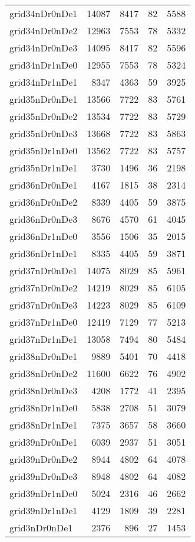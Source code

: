 \documentclass[../../../thesis.tex]{subfiles}
\begin{document}
\begin{longtable}{lrrrr}
grid34nDr0nDe1 & 14087 & 8417 & 82 & 5588 \\
grid34nDr0nDe2 & 12963 & 7553 & 78 & 5332 \\
grid34nDr0nDe3 & 14095 & 8417 & 82 & 5596 \\
grid34nDr1nDe0 & 12955 & 7553 & 78 & 5324 \\
grid34nDr1nDe1 & 8347 & 4363 & 59 & 3925 \\
grid35nDr0nDe1 & 13566 & 7722 & 83 & 5761 \\
grid35nDr0nDe2 & 13534 & 7722 & 83 & 5729 \\
grid35nDr0nDe3 & 13668 & 7722 & 83 & 5863 \\
grid35nDr1nDe0 & 13562 & 7722 & 83 & 5757 \\
grid35nDr1nDe1 & 3730 & 1496 & 36 & 2198 \\
grid36nDr0nDe1 & 4167 & 1815 & 38 & 2314 \\
grid36nDr0nDe2 & 8339 & 4405 & 59 & 3875 \\
grid36nDr0nDe3 & 8676 & 4570 & 61 & 4045 \\
grid36nDr1nDe0 & 3556 & 1506 & 35 & 2015 \\
grid36nDr1nDe1 & 8335 & 4405 & 59 & 3871 \\
grid37nDr0nDe1 & 14075 & 8029 & 85 & 5961 \\
grid37nDr0nDe2 & 14219 & 8029 & 85 & 6105 \\
grid37nDr0nDe3 & 14223 & 8029 & 85 & 6109 \\
grid37nDr1nDe0 & 12419 & 7129 & 77 & 5213 \\
grid37nDr1nDe1 & 13058 & 7494 & 80 & 5484 \\
grid38nDr0nDe1 & 9889 & 5401 & 70 & 4418 \\
grid38nDr0nDe2 & 11600 & 6622 & 76 & 4902 \\
grid38nDr0nDe3 & 4208 & 1772 & 41 & 2395 \\
grid38nDr1nDe0 & 5838 & 2708 & 51 & 3079 \\
grid38nDr1nDe1 & 7375 & 3657 & 58 & 3660 \\
grid39nDr0nDe1 & 6039 & 2937 & 51 & 3051 \\
grid39nDr0nDe2 & 8944 & 4802 & 64 & 4078 \\
grid39nDr0nDe3 & 8948 & 4802 & 64 & 4082 \\
grid39nDr1nDe0 & 5024 & 2316 & 46 & 2662 \\
grid39nDr1nDe1 & 4129 & 1809 & 39 & 2281 \\
grid3nDr0nDe1 & 2376 & 896 & 27 & 1453 \\

\end{longtable}
\end{document}

